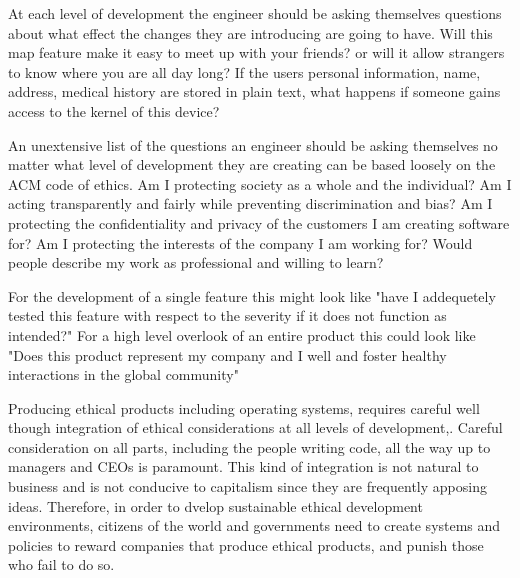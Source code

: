 \documentclass{assignment-x}
\begin{document}
At each level of development the engineer should be asking themselves questions about what effect the changes they are introducing are going to have. Will this map feature make it easy to meet up with your friends? or will it allow strangers to know where you are all day long? If the users personal information, name, address, medical history are stored in plain text, what happens if someone gains access to the kernel of this device?

An unextensive list of the questions an engineer should be asking themselves no matter what level of development they are creating can be based loosely on the ACM code of ethics. Am I protecting society as a whole and the individual? Am I acting transparently and fairly while preventing discrimination and bias? Am I protecting the confidentiality and privacy of the customers I am creating software for? Am I protecting the interests of the company I am working for? Would people describe my work as professional and willing to learn?

For the development of a single feature this might look like "have I addequetely tested this feature with respect to the severity if it does not function as intended?" For a high level overlook of an entire product this could look like "Does this product represent my company and I well and foster healthy interactions in the global community"

Producing ethical products including operating systems,  requires careful well though integration of ethical considerations at all levels of development,. Careful consideration on all parts, including the people writing code, all the way up to managers and CEOs is paramount. This kind of integration is not natural to business and is not conducive to capitalism since they are frequently apposing ideas. Therefore, in order to dvelop sustainable ethical development environments, citizens of the world and governments need to create systems and policies to reward companies that produce ethical products, and punish those who fail to do so.

\pagebreak


\end{document}
